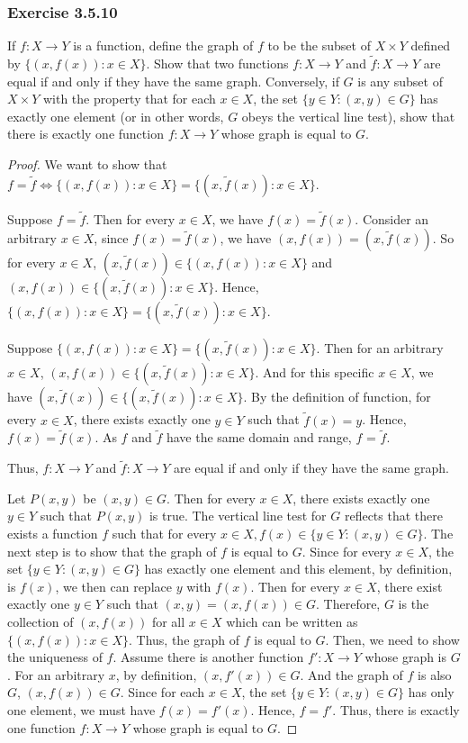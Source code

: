 \documentclass[12pt, letter]{article}
\begin{document}
\subsubsection*{Exercise 3.5.10}
If $f:X\to Y$ is a function, define the graph of $f$ to be the subset of $X\times Y$ defined by $\{(x,f(x)):x\in X\}$. Show that two functions $f:X\to Y$ and $\tilde{f}:X\to Y$ are equal if and only if they have the same graph. Conversely, if $G$ is any subset of $X\times Y$
with the property that for each $x\in X$, the set $\{y\in Y:(x,y)\in G\}$ has exactly one element (or in other words, $G$ obeys the vertical line test), show that there is exactly one function $f:X\to Y$ whose graph is equal to $G$.
\begin{proof}
    We want to show that $f=\tilde{f}\iff\{(x,f(x)):x\in X\}=\{(x,\tilde{f}(x)):x\in X\}$.

    Suppose $f=\tilde{f}$. Then for every $x\in X$, we have $f(x)=\tilde{f}(x)$. Consider an arbitrary $x\in X$, since $f(x)=\tilde{f}(x)$, we have $(x,f(x))=(x,\tilde{f}(x))$. So for every $x\in X$, $(x,\tilde{f}(x))\in\{(x,f(x)):x\in X\}$ and 
    $(x,f(x))\in\{(x,\tilde{f}(x)):x\in X\}$. Hence, $\{(x,f(x)):x\in X\}=\{(x,\tilde{f}(x)):x\in X\}$.

    Suppose $\{(x,f(x)):x\in X\}=\{(x,\tilde{f}(x)):x\in X\}$. Then for an arbitrary $x\in X$, $(x,f(x))\in\{(x,\tilde{f}(x)):x\in X\}$. And for this specific $x\in X$, we have $(x,\tilde{f}(x))\in\{(x,\tilde{f}(x)):x\in X\}$. 
    By the definition of function, for every $x\in X$, there exists exactly one $y\in Y$ such that $\tilde{f}(x)=y$. Hence, $f(x)=\tilde{f}(x)$. As $f$ and $\tilde{f}$ have the same domain and range, $f$ = $\tilde{f}$.

    Thus, $f:X\to Y$ and $\tilde{f}:X\to Y$ are equal if and only if they have the same graph.

    Let $P(x,y)$ be $(x,y)\in G$. Then for every $x\in X$, there exists exactly one $y\in Y$ such that $P(x,y)$ is true. The vertical line test for $G$ reflects that there exists a function $f$ such that for every $x\in X, f(x)\in\{y\in Y:(x,y)\in G\}$.
    The next step is to show that the graph of $f$ is equal to $G$. Since for every $x\in X$, the set $\{y\in Y:(x,y)\in G\}$ has exactly one element and this element, by definition, is $f(x)$, we then can replace $y$ with $f(x)$. Then for every $x\in X$, 
    there exist exactly one $y\in Y$ such that $(x,y)=(x,f(x))\in G$. Therefore, $G$ is the collection of $(x,f(x))$ for all $x\in X$ which can be written as $\{(x,f(x)):x\in X\}$. Thus, the graph of $f$ is equal to $G$.
    Then, we need to show the uniqueness of $f$. Assume there is another function $f':X\to Y$ whose graph is $G$. For an arbitrary $x$, by definition, $(x,f'(x))\in G$. And the graph of $f$ is also $G$, $(x,f(x))\in G$. Since for each $x\in X$, the set 
    $\{y\in Y:(x,y)\in G\}$ has only one element, we must have $f(x)=f'(x)$. Hence, $f=f'$. Thus, there is exactly one function $f:X\to Y$ whose graph is equal to $G$.
\end{proof} 
\end{document}
